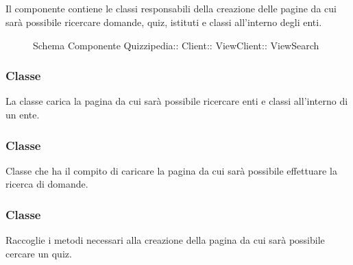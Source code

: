 \subsection{}
Il componente contiene le classi responsabili della creazione delle pagine da cui sarà possibile ricercare domande, quiz, istituti e classi all'interno degli enti.
\begin{figure}[H]
\centering
\noindent{}
\caption[Schema Componente ViewSearch]{Schema Componente Quizzipedia:: Client:: ViewClient:: ViewSearch}
\end{figure}
\subsubsection{Classe }
La classe carica la pagina da cui sarà possibile ricercare enti e classi all'interno di un ente.
\begin{itemize}
\end{itemize}
\subsubsection{Classe }
Classe che ha il compito di caricare la pagina da cui sarà possibile effettuare la ricerca di domande.
\begin{itemize}
\end{itemize}
\subsubsection{Classe }
Raccoglie i metodi necessari alla creazione della pagina da cui sarà possibile cercare un quiz.
\begin{itemize}
\end{itemize}
